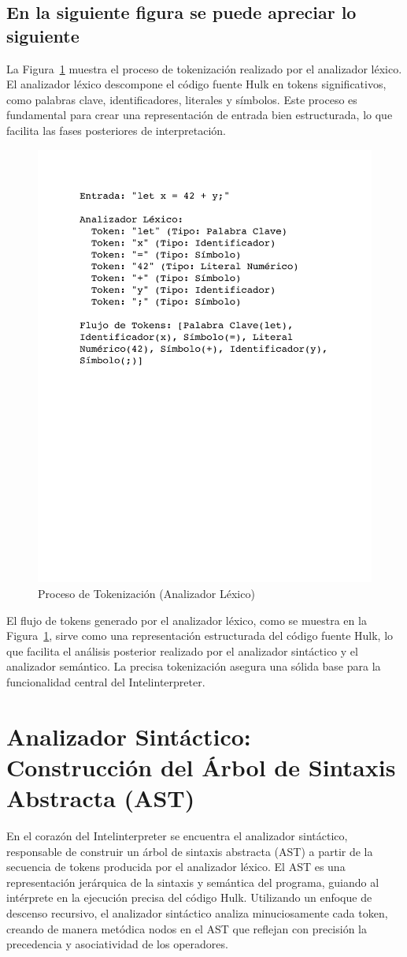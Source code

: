 \documentclass{article}
\begin{document}
\subsection{En la siguiente figura se puede apreciar lo siguiente}

La Figura~\ref{fig:tokenizacion} muestra el proceso de tokenización realizado por el analizador léxico. El analizador léxico descompone el código fuente Hulk en tokens significativos, como palabras clave, identificadores, literales y símbolos. Este proceso es fundamental para crear una representación de entrada bien estructurada, lo que facilita las fases posteriores de interpretación.

\begin{figure}[ht]
    \centering
    \includegraphics[width=0.5\linewidth]{images/token.pdf} %
    \caption{Proceso de Tokenización (Analizador Léxico)}
    \label{fig:tokenizacion}
\end{figure}

El flujo de tokens generado por el analizador léxico, como se muestra en la Figura~\ref{fig:tokenizacion}, sirve como una representación estructurada del código fuente Hulk, lo que facilita el análisis posterior realizado por el analizador sintáctico y el analizador semántico. La precisa tokenización asegura una sólida base para la funcionalidad central del Intelinterpreter.




\section{Analizador Sintáctico: Construcción del Árbol de Sintaxis Abstracta (AST)}
En el corazón del Intelinterpreter se encuentra el analizador sintáctico, responsable de construir un árbol de sintaxis abstracta (AST) a partir de la secuencia de tokens producida por el analizador léxico. El AST es una representación jerárquica de la sintaxis y semántica del programa, guiando al intérprete en la ejecución precisa del código Hulk. Utilizando un enfoque de descenso recursivo, el analizador sintáctico analiza minuciosamente cada token, creando de manera metódica nodos en el AST que reflejan con precisión la precedencia y asociatividad de los operadores.
\end{document}
